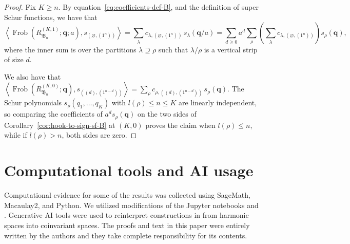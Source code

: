 \documentclass[11pt, reqno]{amsart}
\theoremstyle{definition}
\theoremstyle{remark}
\numberwithin{equation}{section}
\newcommand{\0}{\emptyset}
\DeclareMathOperator{\Frob}{Frob}
\begin{document}
\begin{proof}
    Fix $K\geq n$.
    By equation~\eqref{eq:coefficients-def-B}, and the definition of super Schur functions, we have that
    \begin{equation*}
            \left\langle 
            \Frob \left(R_{\mathfrak{B}_n}^{(K,1)}; \mathbf{q}; a\right), 
            s_{(\varnothing,(1^n))} \right\rangle = 
            \sum_{\lambda} c_{\lambda,(\varnothing,(1^n))}\, s_\lambda(\mathbf{q}/a) = 
            \sum_{d\geq0} a^d \sum_{\rho}\left(\sum_{\lambda} c_{\lambda,(\varnothing,(1^n))}\right) 
            s_\rho(\mathbf{q}), 
    \end{equation*}
    where the inner sum is over the partitions $\lambda\supseteq\rho$ such that $\lambda/\rho$ is a vertical strip of size $d$.

    We also have that 
    $\left\langle \Frob \left(R_{\mathfrak{B}_n}^{(K,0)}; \mathbf{q}\right), 
    s_{((d),(1^{n-d}))} \right\rangle = 
    \sum_\rho c_{\rho,((d),(1^{n-d}))}\,s_\rho(\mathbf{q})$. 
    The Schur polynomials $s_\rho(q_1,\ldots,q_K)$ with $l(\rho)\leq n\leq K$ are linearly independent, so comparing the coefficients of $a^d s_\rho(\mathbf{q})$ on the two sides of Corollary~\ref{cor:hook-to-sign-sf-B} at $(K,0)$ proves the claim when $l(\rho)\leq n$, while if $l(\rho)>n$, both sides are zero.
\end{proof}

\section*{Computational tools and AI usage}

Computational evidence for some of the results was collected using SageMath, Macaulay2, and Python. 
We utilized modifications of the Jupyter notebooks \cite{Zabrocki-code} and \cite{Bergeron-code}. 
Generative AI tools were used to reinterpret constructions in \cite{GLM} 
from harmonic spaces into coinvariant spaces. 
The proofs and text in this paper were entirely written by the authors 
and they take complete responsibility for its contents. 


\end{document}

